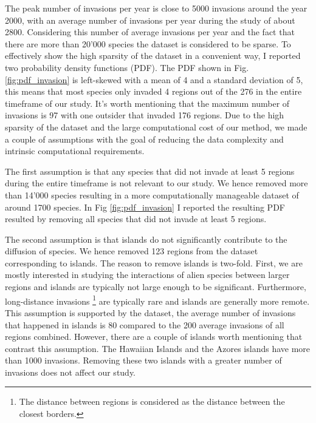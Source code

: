 \documentclass[mscthesis]{usiinfthesis}
\begin{document}
The peak number of invasions per year is close to 5000 invasions around the year 2000, with an average number of invasions per year during the study of about 2800. Considering this number of average invasions per year and the fact that there are more than 20'000 species the dataset is considered to be sparse. To effectively show the high sparsity of the dataset in a convenient way, I reported two probability density functions (PDF). The PDF shown in Fig. \ref{fig:pdf_invasion} is left-skewed with a mean of 4 and a standard deviation of 5, this means that most species only invaded 4 regions out of the 276 in the entire timeframe of our study. It's worth mentioning that the maximum number of invasions is 97 with one outsider that invaded 176 regions. Due to the high sparsity of the dataset and the large computational cost of our method, we made a couple of assumptions with the goal of reducing the data complexity and intrinsic computational requirements. 

The first assumption is that any species that did not invade at least 5 regions during the entire timeframe is not relevant to our study. We hence removed more than 14'000 species resulting in a more computationally manageable dataset of around 1700 species. In Fig \ref{fig:pdf_invasion} I reported the resulting PDF resulted by removing all species that did not invade at least 5 regions. 

The second assumption is that islands do not significantly contribute to the diffusion of species. We hence removed 123 regions from the dataset corresponding to islands. The reason to remove islands is two-fold. First, we are mostly interested in studying the interactions of alien species between larger regions and islands are typically not large enough to be significant. Furthermore, long-distance invasions \footnote{The distance between regions is considered as the distance between the closest borders.} are typically rare \cite{paper:lady} and islands are generally more remote. This assumption is supported by the dataset, the average number of invasions that happened in islands is 80 compared to the 200 average invasions of all regions combined. However, there are a couple of islands worth mentioning that contrast this assumption. The Hawaiian Islands and the Azores islands have more than 1000 invasions. Removing these two islands with a greater number of invasions does not affect our study.

\end{document}
